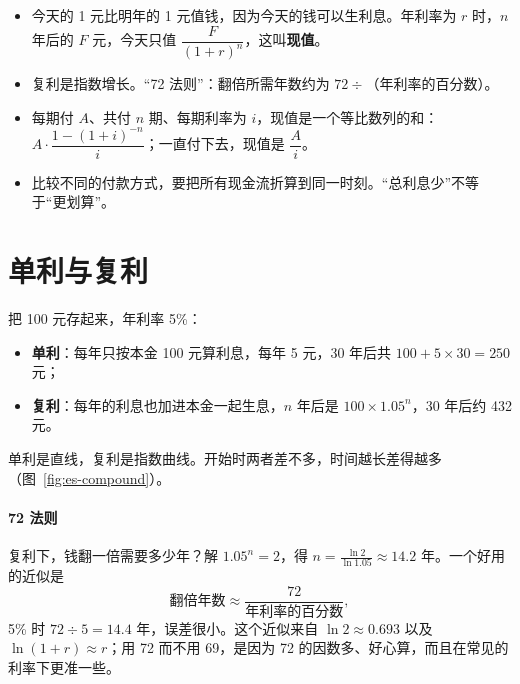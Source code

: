 
\begin{keypoints}
\begin{itemize}
  \item 今天的 1 元比明年的 1 元值钱，因为今天的钱可以生利息。年利率为 $r$ 时，$n$ 年后的 $F$ 元，今天只值 $\dfrac{F}{(1+r)^n}$，这叫\textbf{现值}。
  \item 复利是指数增长。“72 法则”：翻倍所需年数约为 $72\div$（年利率的百分数）。
  \item 每期付 $A$、共付 $n$ 期、每期利率为 $i$，现值是一个等比数列的和：$A\cdot\dfrac{1-(1+i)^{-n}}{i}$；一直付下去，现值是 $\dfrac Ai$。
  \item 比较不同的付款方式，要把所有现金流折算到同一时刻。“总利息少”不等于“更划算”。
\end{itemize}
\end{keypoints}

\section{单利与复利}

把 100 元存起来，年利率 5\%：
\begin{itemize}
  \item \textbf{单利}：每年只按本金 100 元算利息，每年 5 元，30 年后共 $100+5\times30=250$ 元；
  \item \textbf{复利}：每年的利息也加进本金一起生息，$n$ 年后是 $100\times1.05^n$，30 年后约 432 元。
\end{itemize}
单利是直线，复利是指数曲线。开始时两者差不多，时间越长差得越多（图~\ref{fig:es-compound}）。

\paragraph{72 法则}
复利下，钱翻一倍需要多少年？解 $1.05^n=2$，得 $n=\frac{\ln2}{\ln1.05}\approx14.2$ 年。一个好用的近似是
\[
  \text{翻倍年数}\approx\frac{72}{\text{年利率的百分数}},
\]
5\% 时 $72\div5=14.4$ 年，误差很小。这个近似来自 $\ln2\approx0.693$ 以及 $\ln(1+r)\approx r$；用 72 而不用 69，是因为 72 的因数多、好心算，而且在常见的利率下更准一些。


